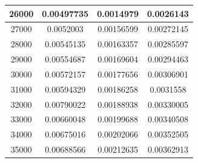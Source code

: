 \begin{center}
\begin{tabular}{| c | c | c | c |}
26000 & 0.00497735 & 0.0014979 & 0.0026143 \\ \hline
27000 & 0.0052003 & 0.00156599 & 0.00272145 \\ \hline
28000 & 0.00545135 & 0.00163357 & 0.00285597 \\ \hline
29000 & 0.00554687 & 0.00169604 & 0.00294463 \\ \hline
30000 & 0.00572157 & 0.00177656 & 0.00306901 \\ \hline
31000 & 0.00594329 & 0.00186258 & 0.0031558 \\ \hline
32000 & 0.00790022 & 0.00188938 & 0.00330005 \\ \hline
33000 & 0.00660048 & 0.00199688 & 0.00340508 \\ \hline
34000 & 0.00675016 & 0.00202066 & 0.00352505 \\ \hline
35000 & 0.00688566 & 0.00212635 & 0.00362913 \\ \hline
\hline
\end{tabular}
\end{center}
